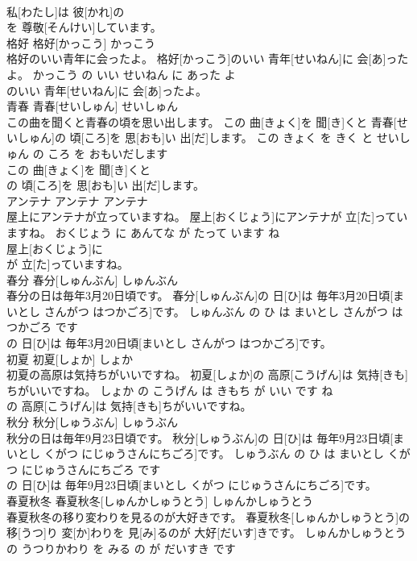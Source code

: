 \documentclass[8pt]{extreport}
\begin{document}
\begin{CJK}{UTF8}{min}
\\	私[わたし]は 彼[かれ]の
\\	を 尊敬[そんけい]しています。			
\\	格好	格好[かっこう]	かっこう	
\\	格好のいい青年に会ったよ。	格好[かっこう]のいい 青年[せいねん]に 会[あ]ったよ。	かっこう の いい せいねん に あった よ	
\\	のいい 青年[せいねん]に 会[あ]ったよ。			
\\	青春	青春[せいしゅん]	せいしゅん	
\\	この曲を聞くと青春の頃を思い出します。	この 曲[きょく]を 聞[き]くと 青春[せいしゅん]の 頃[ころ]を 思[おも]い 出[だ]します。	この きょく を きく と せいしゅん の ころ を おもいだします	
\\	この 曲[きょく]を 聞[き]くと
\\	の 頃[ころ]を 思[おも]い 出[だ]します。			
\\	アンテナ	アンテナ	アンテナ	
\\	屋上にアンテナが立っていますね。	屋上[おくじょう]にアンテナが 立[た]っていますね。	おくじょう に あんてな が たって います ね	
\\	屋上[おくじょう]に
\\	が 立[た]っていますね。			
\\	春分	春分[しゅんぶん]	しゅんぶん	
\\	春分の日は毎年3月20日頃です。	春分[しゅんぶん]の 日[ひ]は 毎年3月20日頃[まいとし さんがつ はつかごろ]です。	しゅんぶん の ひ は まいとし さんがつ はつかごろ です	
\\	の 日[ひ]は 毎年3月20日頃[まいとし さんがつ はつかごろ]です。			
\\	初夏	初夏[しょか]	しょか	
\\	初夏の高原は気持ちがいいですね。	初夏[しょか]の 高原[こうげん]は 気持[きも]ちがいいですね。	しょか の こうげん は きもち が いい です ね	
\\	の 高原[こうげん]は 気持[きも]ちがいいですね。			
\\	秋分	秋分[しゅうぶん]	しゅうぶん	
\\	秋分の日は毎年9月23日頃です。	秋分[しゅうぶん]の 日[ひ]は 毎年9月23日頃[まいとし くがつ にじゅうさんにちごろ]です。	しゅうぶん の ひ は まいとし くがつ にじゅうさんにちごろ です	
\\	の 日[ひ]は 毎年9月23日頃[まいとし くがつ にじゅうさんにちごろ]です。			
\\	春夏秋冬	春夏秋冬[しゅんかしゅうとう]	しゅんかしゅうとう	
\\	春夏秋冬の移り変わりを見るのが大好きです。	春夏秋冬[しゅんかしゅうとう]の 移[うつ]り 変[か]わりを 見[み]るのが 大好[だいす]きです。	しゅんかしゅうとう の うつりかわり を みる の が だいすき です	

\end{CJK}
\end{document}
